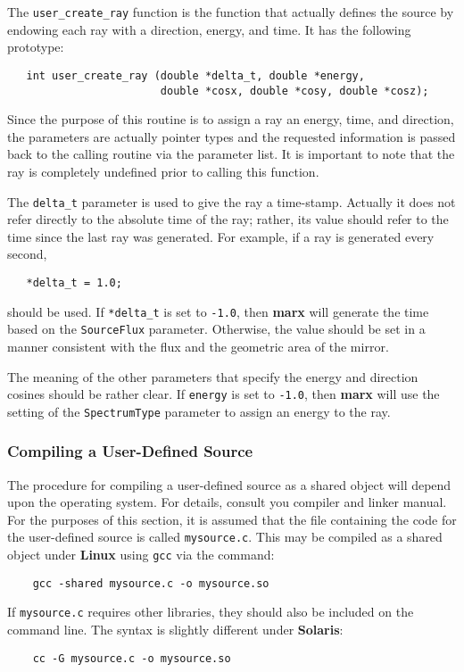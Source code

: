 \documentclass{article}
\newcommand{\marx}{{\bf marx}}
\begin{document}
 The \verb|user_create_ray| function is the function that actually
 defines the source by endowing each ray with a direction, energy, and
 time.  It has the following prototype:
\begin{verbatim} 
   int user_create_ray (double *delta_t, double *energy,
                        double *cosx, double *cosy, double *cosz);
\end{verbatim} 
 Since the purpose of this routine is to assign a ray an energy, time,
 and direction, the parameters are actually pointer types and the
 requested information is passed back to the calling routine via the
 parameter list.  It is important to note that the ray is completely
 undefined prior to calling this function.

 The \verb|delta_t| parameter is used to give the ray a time-stamp.
 Actually it does not refer directly to the absolute time of the ray;
 rather, its value should refer to the time since the last ray was
 generated.  For example, if a ray is generated every second,
\begin{verbatim} 
   *delta_t = 1.0;
\end{verbatim}
 should be used.  If \verb|*delta_t| is set to \verb|-1.0|, then
 \marx{} will generate the time based on the \verb|SourceFlux|
 parameter. Otherwise, the value should be set in a manner consistent
 with the flux and the geometric area of the mirror.

 The meaning of the other parameters that specify the energy and
 direction cosines should be rather clear.  If \verb|energy| is set to
 \verb|-1.0|, then \marx{} will use the setting of the
 \verb|SpectrumType| parameter to assign an energy to the ray.

\subsubsection{Compiling a User-Defined Source}
 The procedure for compiling a user-defined source as a shared object
 will depend upon the operating system.  For details, consult you
 compiler and linker manual.  For the purposes of this section, it
 is assumed that the file containing the code for the
 user-defined source is called \verb|mysource.c|.  This may be
 compiled as a shared object under {\bf Linux} using \verb|gcc| via
 the command:
\begin{verbatim} 
    gcc -shared mysource.c -o mysource.so
\end{verbatim}
 If \verb|mysource.c| requires other libraries, they should also be
 included on the command line.  The syntax is slightly different under
 {\bf Solaris}:
\begin{verbatim} 
    cc -G mysource.c -o mysource.so
\end{verbatim}
 
\end{document}
